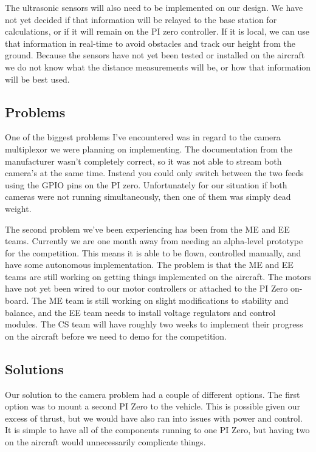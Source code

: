 \documentclass[onecolumn, draftclsnofoot,10pt, compsoc]{IEEEtran}
\begin{document}
The ultrasonic sensors will also need to be implemented on our design. We have not yet decided if that information will be relayed to the base station for calculations, or if it will remain on the PI zero controller. If it is local, we can use that information in real-time to avoid obstacles and track our height from the ground. Because the sensors have not yet been tested or installed on the aircraft we do not know what the distance measurements will be, or how that information will be best used.

\subsection{Problems}

One of the biggest problems I've encountered was in regard to the camera multiplexor we were planning on implementing. The documentation from the manufacturer wasn't completely correct, so it was not able to stream both camera’s at the same time. Instead you could only switch between the two feeds using the GPIO pins on the PI zero. Unfortunately for our situation if both cameras were not running simultaneously, then one of them was simply dead weight.

The second problem we've been experiencing has been from the ME and EE teams. Currently we are one month away from needing an alpha-level prototype for the competition. This means it is able to be flown, controlled manually, and have some autonomous implementation. The problem is that the ME and EE teams are still working on getting things implemented on the aircraft. The motors have not yet been wired to our motor controllers or attached to the PI Zero on-board. The ME team is still working on slight modifications to stability and balance, and the EE team needs to install voltage regulators and control modules. The CS team will have roughly two weeks to implement their progress on the aircraft before we need to demo for the competition.  

\subsection{Solutions}

Our solution to the camera problem had a couple of different options. The first option was to mount a second PI Zero to the vehicle. This is possible given our excess of thrust, but we would have also ran into issues with power and control. It is simple to have all of the components running to one PI Zero, but having two on the aircraft would unnecessarily complicate things. 
\end{document}
